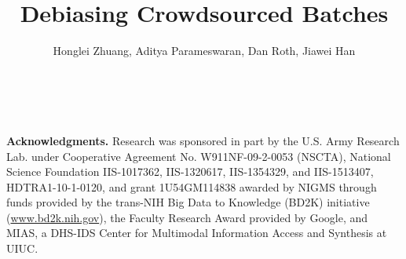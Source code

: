 \documentclass{sig-alternate-2013}
\newcommand{\vpara}[1]{\vspace{0.05in}\noindent\textbf{#1 }}
\begin{document}
\title{
Debiasing Crowdsourced Batches %
}



\author{
\alignauthor Honglei Zhuang, Aditya Parameswaran, Dan Roth, Jiawei Han \\
  \\
  \\
}



%



\maketitle









\sloppy










\scriptsize
\vpara{Acknowledgments.}
Research was sponsored in part by the U.S. Army Research Lab. under Cooperative Agreement No. W911NF-09-2-0053 (NSCTA), National Science Foundation IIS-1017362, IIS-1320617, IIS-1354329, and IIS-1513407, HDTRA1-10-1-0120, and grant 1U54GM114838 awarded by NIGMS through funds provided by the trans-NIH Big Data to Knowledge (BD2K) initiative (\url{www.bd2k.nih.gov}), the Faculty Research Award provided by Google, and MIAS, a DHS-IDS Center for Multimodal Information Access and Synthesis at UIUC. %
\normalsize


\balance
\small




%
\end{document}
